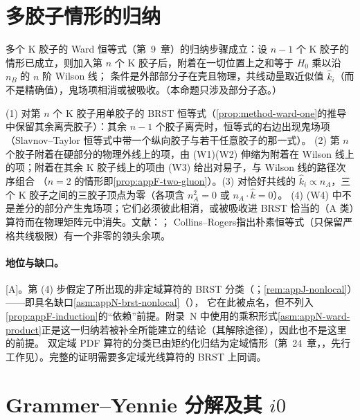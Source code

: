 \section{多胶子情形的归纳}\label{sec:appF-induction}

\begin{proposition}\label{prop:appF-induction}
多个 K 胶子的 Ward 恒等式（第~9~章）的归纳步骤成立：设 $n-1$ 个 K 胶子的情形已成立，则加入第 $n$ 个 K 胶子后，附着在一切位置上之和等于 $H_0$ 乘以沿 $n_B$ 的 $n$ 阶 Wilson 线；
条件是外部部分子在壳且物理，共线动量取近似值 $\hat k_i$（而不是精确值），鬼场项相消或被吸收。（本命题只涉及部分子态。）
\end{proposition}

\begin{proofsketch}
(1) 对第 $n$ 个 K 胶子用单胶子的 BRST 恒等式（\cref{prop:method-ward-one}的推导中保留其余离壳胶子）：其余 $n-1$ 个胶子离壳时，恒等式的右边出现鬼场项（Slavnov--Taylor 恒等式中带一个纵向胶子与若干任意胶子的那一式）。
(2) 第 $n$ 个胶子附着在硬部分的物理外线上的项，由 (W1)(W2) 伸缩为附着在 Wilson 线上的项；附着在其余 K 胶子线上的项由 (W3) 给出对易子，与 Wilson 线的路径次序组合
（$n=2$ 的情形即\cref{prop:appF-two-gluon}）。(3) 对恰好共线的 $\hat k_i\propto n_A$，三个 K 胶子之间的三胶子顶点为零（各项含 $n_A^2=0$ 或 $n_A\cdot\hat k=0$）。
(4) (W4) 中不是差分的部分产生鬼场项；它们必须彼此相消，或被吸收进 BRST 恰当的（A 类）算符而在物理矩阵元中消失。文献：\cite[第~11.9、11.3.2~节]{Collins2011}；
Collins--Rogers\cite{Collins:2008sg}指出朴素恒等式（只保留严格共线极限）有一个非零的领头余项。
\end{proofsketch}

\paragraph{地位与缺口。}[A]。第 (4) 步假定了所出现的非定域算符的 BRST 分类（\cite[第~11.3.2~节]{Collins2011}；\cref{rem:appJ-nonlocal}）——即具名缺口\cref{asm:appN-brst-nonlocal}（\tagC），
它在此被点名，但不列入\cref{prop:appF-induction}的“依赖”前提。附录~N 中使用的乘积形式\cref{asm:appN-ward-product}正是这一归纳若被补全所能建立的结论（其解除途径），因此也不是这里的前提。
双定域 PDF 算符的分类已由矩约化归结为定域情形（第~24~章，\tagA，先行工作见\cite{Braun:2019qtp}）。完整的证明需要多定域光线算符的 BRST 上同调。

\section{Grammer--Yennie 分解及其 \texorpdfstring{$i0$}{i0}}\label{sec:appF-gy}

